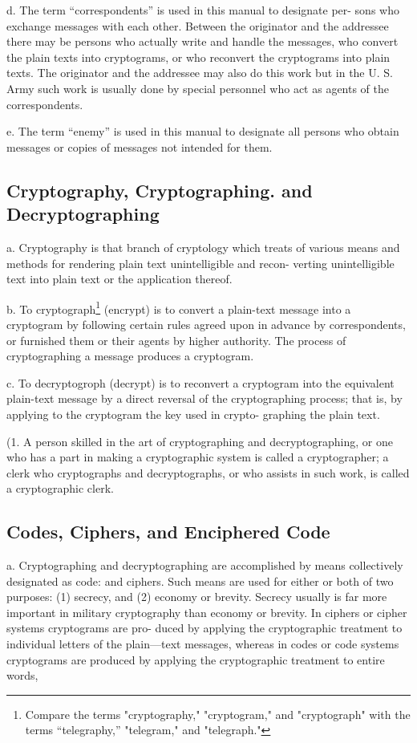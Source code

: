 d. The term “correspondents” is used in this manual to designate per-
sons who exchange messages with each other. Between the originator
and the addressee there may be persons who actually write and handle
the messages, who convert the plain texts into cryptograms, or who
reconvert the cryptograms into plain texts. The originator and the
addressee may also do this work but in the U. S. Army such work is
usually done by special personnel who act as agents of the correspondents.

e. The term “enemy” is used in this manual to designate all persons
who obtain messages or copies of messages not intended for them.

\subsection{Cryptography, Cryptographing. and Decryptographing}

a. Cryptography is that branch of cryptology which treats of various
means and methods for rendering plain text unintelligible and recon-
verting unintelligible text into plain text or the application thereof.

b. To cryptograph\footnote{ Compare the terms "cryptography," "cryptogram," and "cryptograph" with the terms “telegraphy,” "telegram," and "telegraph."} (encrypt) is to convert a plain-text message into
a cryptogram by following certain rules agreed upon in advance by
correspondents, or furnished them or their agents by higher authority.
The process of cryptographing a message produces a cryptogram.

c. To decryptogroph (decrypt) is to reconvert a cryptogram into the
equivalent plain-text message by a direct reversal of the cryptographing
process; that is, by applying to the cryptogram the key used in crypto-
graphing the plain text.

(1. A person skilled in the art of cryptographing and decryptographing,
or one who has a part in making a cryptographic system is called a
cryptographer; a clerk who cryptographs and decryptographs, or who
assists in such work, is called a cryptographic clerk.

\subsection{Codes, Ciphers, and Enciphered Code}

a. Cryptographing and decryptographing are accomplished by means
collectively designated as code: and ciphers. Such means are used for
either or both of two purposes: (1) secrecy, and (2) economy or brevity.
Secrecy usually is far more important in military cryptography than
economy or brevity. In ciphers or cipher systems cryptograms are pro-
duced by applying the cryptographic treatment to individual letters of
the plain—text messages, whereas in codes or code systems cryptograms
are produced by applying the cryptographic treatment to entire words,



